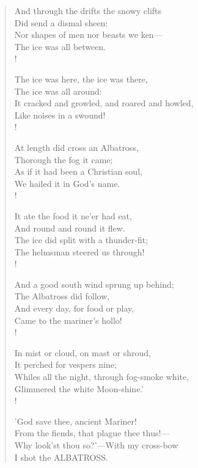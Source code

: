 \documentclass[11pt,twoside]{book}
\begin{document}
\begin{verse}
And through the drifts the snowy clifts \\
Did send a dismal sheen: \\
Nor shapes of men nor beasts we ken— \\
The ice was all between. \\!

The ice was here, the ice was there, \\
The ice was all around: \\
It cracked and growled, and roared and howled, \\
Like noises in a swound! \\!

At length did cross an Albatross, \\
Thorough the fog it came; \\
As if it had been a Christian soul, \\
We hailed it in God's name. \\!

It ate the food it ne'er had eat, \\
And round and round it flew. \\
The ice did split with a thunder-fit; \\
The helmsman steered us through! \\!

And a good south wind sprung up behind; \\
The Albatross did follow, \\
And every day, for food or play, \\
Came to the mariner's hollo! \\!

In mist or cloud, on mast or shroud, \\
It perched for vespers nine; \\
Whiles all the night, through fog-smoke white, \\
Glimmered the white Moon-shine.' \\!

'God save thee, ancient Mariner! \\
From the fiends, that plague thee thus!— \\
Why look'st thou so?'—With my cross-bow \\
I shot the ALBATROSS.

\end{verse}
\end{document}
